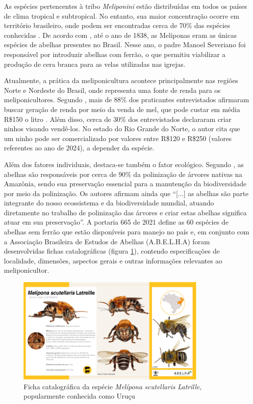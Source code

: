 As espécies pertencentes à tribo \textit{Meliponini} estão distribuídas em todos os países de clima tropical e subtropical. No entanto, sua maior concentração ocorre em território brasileiro, onde podem ser encontradas cerca de 70\% das espécies conhecidas \cite{viana:2012}. De acordo com , até o ano de 1838, as Meliponas eram as únicas espécies de abelhas presentes no Brasil. Nesse ano, o padre Manoel Severiano foi responsável por introduzir abelhas com ferrão, o que permitiu viabilizar a produção de cera branca para as velas utilizadas nas igrejas.

Atualmente, a prática da meliponicultura acontece principalmente nas regiões Norte e Nordeste do Brasil, onde representa uma fonte de renda para os meliponicultores. Segundo , mais de 88\% dos praticantes entrevistados afirmaram buscar geração de renda por meio da venda de mel, que pode custar em média R\$150 o litro \cite{drummond:2024}. Além disso, cerca de 30\% dos entrevistados declararam criar ninhos visando vendê-los. No estado do Rio Grande do Norte, o autor cita que um ninho pode ser comercializado por valores entre R\$120 e R\$250 (valores referentes ao ano de 2024), a depender da espécie.

Além dos fatores individuais, destaca-se também o fator ecológico. Segundo , as abelhas são responsáveis por cerca de 90\% da polinização de árvores nativas na Amazônia, sendo sua preservação essencial para a manutenção da biodiversidade por meio da polinização. Os autores afirmam ainda que “[...] as abelhas são parte integrante do nosso ecossistema e da biodiversidade mundial, atuando diretamente no trabalho de polinização das árvores e criar estas abelhas significa atuar em sua preservação”.
A portaria 665 de 2021 \cite{icmbio2021portaria665} define as 60 espécies de abelhas sem ferrão que estão disponíveis para manejo no país e, em conjunto com a Associação Brasileira de Estudos de Abelhas (A.B.E.L.H.A) foram desenvolvidas fichas catalográficas (figura \ref{fig:ficha-abelha}), contendo especificações de localidade, dimensões, aspectos gerais e outras informações relevantes ao meliponicultor.

\begin{figure}[!htbp]
     \caption{Ficha catalográfica da espécie \textit{Melípona scutellaris Latrille}, popularmente conhecida como Uruçu}
     \label{fig:ficha-abelha}
     \includegraphics[width=0.83\textwidth]{figuras/Trabalhos Correlatos/Melipona-scutellaris.png}
 \end{figure}
 
